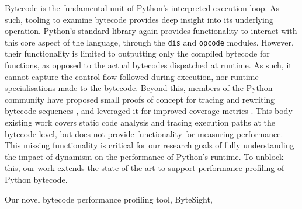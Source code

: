 



Bytecode is the fundamental unit of Python's interpreted execution loop. As such, tooling to examine bytecode provides deep insight into its underlying operation. %
Python's standard library again provides functionality to interact with this core aspect of the language, through the \texttt{dis} and \texttt{opcode} modules. However, their functionality is limited to outputting only the compiled bytecode for functions, as opposed to the actual bytecodes dispatched at runtime. As such, it cannot capture the control flow followed during execution, nor runtime specialisations made to the bytecode.
Beyond this, members of the Python community have proposed small proofs of concept for tracing and rewriting bytecode sequences \cite{0xecCodingReversingHacking2017} \cite{clementrouaultUnderstandingPythonExecution}, and leveraged it for improved coverage metrics \cite{nedbatchelderWickedHackPython2008}.
This body existing work covers static code analysis and tracing execution paths at the bytecode level, but does not provide functionality for measuring performance. This missing functionality is critical for our research goals of fully understanding the impact of dynamism on the performance of Python's runtime.
To unblock this, our work extends the state-of-the-art to support performance profiling of Python bytecode.

Our novel bytecode performance profiling tool, ByteSight,
